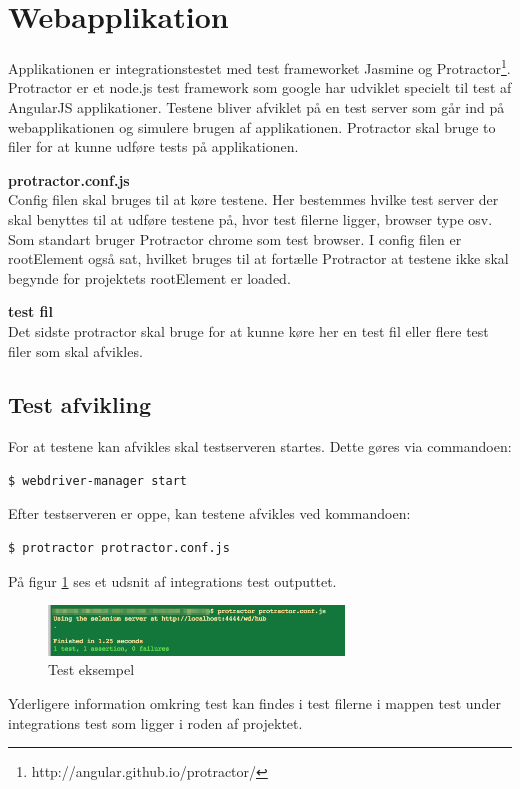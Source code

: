 \section{Webapplikation}
Applikationen er integrationstestet med test frameworket Jasmine og Protractor\footnote{http://angular.github.io/protractor/}. Protractor er et node.js test framework som google har udviklet specielt til test af AngularJS applikationer. Testene bliver afviklet på en test server som går ind på webapplikationen og simulere brugen af applikationen. Protractor skal bruge to filer for at kunne udføre tests på applikationen.\linebreak

\textbf{protractor.conf.js}\\
Config filen skal bruges til at køre testene. Her bestemmes hvilke test server der skal benyttes til at udføre testene på, hvor test filerne ligger, browser type osv. Som standart bruger Protractor chrome som test browser. I config filen er rootElement også sat, hvilket bruges til at fortælle Protractor at testene ikke skal begynde for projektets rootElement er loaded. 

\textbf{test fil}\\
Det sidste protractor skal bruge for at kunne køre her en test fil eller flere test filer som skal afvikles. 

\subsection*{Test afvikling}
For at testene kan afvikles skal testserveren startes. Dette gøres via commandoen:

\begin{lstlisting}[language=bash]
	$ webdriver-manager start
\end{lstlisting}

Efter testserveren er oppe, kan testene afvikles ved kommandoen:

\begin{lstlisting}[language=bash]
	$ protractor protractor.conf.js
\end{lstlisting}

På figur \ref{fig:integration_exampel} ses et udsnit af integrations test outputtet.

\vspace{-5pt}
\begin{figure}[H]
	\centering
	\includegraphics[width=0.7\textwidth]{Billeder/Test/integration_web.png}
	\vspace{-5pt}
	\caption{Test eksempel}
	\label{fig:integration_exampel}
\end{figure}

Yderligere information omkring test kan findes i test filerne i mappen test under integrations test som ligger i roden af projektet.